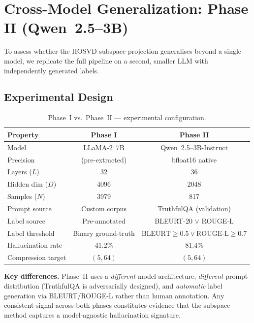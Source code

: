 \documentclass[11pt,a4paper]{article}
\begin{document}
\section{Cross-Model Generalization: Phase II (Qwen~2.5--3B)}

To assess whether the HOSVD subspace projection generalises beyond a single
model, we replicate the full pipeline on a second, smaller LLM with
independently generated labels.

\subsection{Experimental Design}

\begin{table}[H]
\centering
\begin{tabular}{lcc}
\toprule
\textbf{Property} & \textbf{Phase I} & \textbf{Phase II} \\
\midrule
Model                & LLaMA-2~7B        & Qwen~2.5--3B-Instruct \\
Precision            & (pre-extracted)   & bfloat16 native \\
Layers ($L$)         & 32                & 36 \\
Hidden dim ($D$)     & 4096              & 2048 \\
Samples ($N$)        & 3979              & 817 \\
Prompt source        & Custom corpus     & TruthfulQA (validation) \\
Label source         & Pre-annotated     & BLEURT-20 $\lor$ ROUGE-L \\
Label threshold      & Binary ground-truth & $\text{BLEURT}\ge 0.5 \lor \text{ROUGE-L}\ge 0.7$ \\
Hallucination rate   & 41.2\%            & 81.4\% \\
Compression target   & $(5, 64)$         & $(5, 64)$ \\
\bottomrule
\end{tabular}
\caption{Phase~I vs.\ Phase~II — experimental configuration.}
\end{table}

\noindent
\textbf{Key differences.}
Phase~II uses a \emph{different} model architecture, \emph{different} prompt
distribution (TruthfulQA is adversarially designed), and \emph{automatic}
label generation via BLEURT/ROUGE-L rather than human annotation.  Any
consistent signal across both phases constitutes evidence that the subspace
method captures a model-agnostic hallucination signature.
\end{document}
